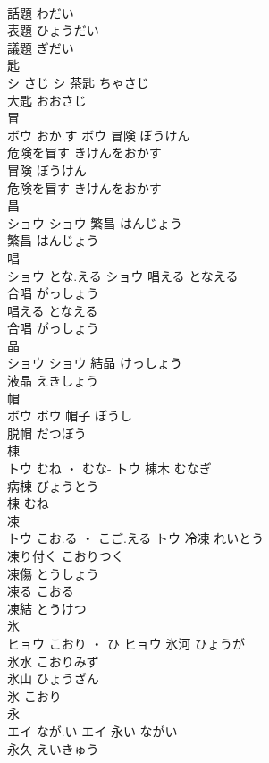 \documentclass[8pt]{extreport}
\begin{document}
\begin{CJK}{UTF8}{min}
\\	話題	わだい	
\\	表題	ひょうだい	
\\	議題	ぎだい	
\\	匙	
\\	シ	さじ	シ													茶匙	ちゃさじ	
\\	大匙	おおさじ	
\\	冒	
\\	ボウ	おか.す	ボウ	冒険	ぼうけん	
\\	危険を冒す	きけんをおかす	
\\	冒険	ぼうけん	
\\	危険を冒す	きけんをおかす	
\\	昌	
\\	ショウ		ショウ	繁昌	はんじょう	
\\	繁昌	はんじょう	
\\	唱	
\\	ショウ	とな.える	ショウ	唱える	となえる	
\\	合唱	がっしょう	
\\	唱える	となえる	
\\	合唱	がっしょう	
\\	晶	
\\	ショウ		ショウ	結晶	けっしょう	
\\	液晶	えきしょう	
\\	帽	
\\	ボウ		ボウ	帽子	ぼうし	
\\	脱帽	だつぼう	
\\	棟	
\\	トウ	むね ・ むな-	トウ	棟木	むなぎ	
\\	病棟	びょうとう	
\\	棟	むね	
\\	凍	
\\	トウ	こお.る ・ こご.える	トウ	冷凍	れいとう	
\\	凍り付く	こおりつく	
\\	凍傷	とうしょう	
\\	凍る	こおる	
\\	凍結	とうけつ	
\\	氷	
\\	ヒョウ	こおり ・ ひ	ヒョウ	氷河	ひょうが	
\\	氷水	こおりみず	
\\	氷山	ひょうざん	
\\	氷	こおり	
\\	永	
\\	エイ	なが.い	エイ	永い	ながい	
\\	永久	えいきゅう	

\end{CJK}
\end{document}
